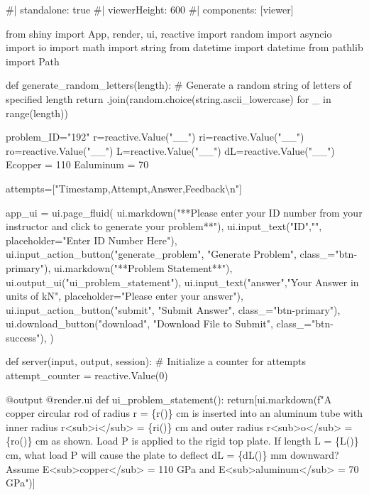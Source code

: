 \documentclass[
  letterpaper,
  DIV=11,
  numbers=noendperiod]{scrreprt}
\newenvironment{Shaded}{\begin{snugshade}}{\end{snugshade}}
\newcommand{\NormalTok}[1]{\textcolor[rgb]{0.00,0.23,0.31}{#1}}
\begin{document}
\begin{Shaded}
\begin{Highlighting}[]
\NormalTok{\#| standalone: true}
\NormalTok{\#| viewerHeight: 600}
\NormalTok{\#| components: [viewer]}

\NormalTok{from shiny import App, render, ui, reactive}
\NormalTok{import random}
\NormalTok{import asyncio}
\NormalTok{import io}
\NormalTok{import math}
\NormalTok{import string}
\NormalTok{from datetime import datetime}
\NormalTok{from pathlib import Path}

\NormalTok{def generate\_random\_letters(length):}
\NormalTok{    \# Generate a random string of letters of specified length}
\NormalTok{    return \textquotesingle{}\textquotesingle{}.join(random.choice(string.ascii\_lowercase) for \_ in range(length)) }

\NormalTok{problem\_ID="192"}
\NormalTok{r=reactive.Value("\_\_")}
\NormalTok{ri=reactive.Value("\_\_")}
\NormalTok{ro=reactive.Value("\_\_")}
\NormalTok{L=reactive.Value("\_\_")}
\NormalTok{dL=reactive.Value("\_\_")}
\NormalTok{Ecopper = 110}
\NormalTok{Ealuminum = 70}



\NormalTok{attempts=["Timestamp,Attempt,Answer,Feedback\textbackslash{}n"]}

\NormalTok{app\_ui = ui.page\_fluid(}
\NormalTok{    ui.markdown("**Please enter your ID number from your instructor and click to generate your problem**"),}
\NormalTok{    ui.input\_text("ID","", placeholder="Enter ID Number Here"),}
\NormalTok{    ui.input\_action\_button("generate\_problem", "Generate Problem", class\_="btn{-}primary"),}
\NormalTok{    ui.markdown("**Problem Statement**"),}
\NormalTok{    ui.output\_ui("ui\_problem\_statement"),}
\NormalTok{    ui.input\_text("answer","Your Answer in units of kN", placeholder="Please enter your answer"),}
\NormalTok{    ui.input\_action\_button("submit", "Submit Answer", class\_="btn{-}primary"),}
\NormalTok{    ui.download\_button("download", "Download File to Submit", class\_="btn{-}success"),}
\NormalTok{)}


\NormalTok{def server(input, output, session):}
\NormalTok{    \# Initialize a counter for attempts}
\NormalTok{    attempt\_counter = reactive.Value(0)}

\NormalTok{    @output}
\NormalTok{    @render.ui}
\NormalTok{    def ui\_problem\_statement():}
\NormalTok{        return[ui.markdown(f"A copper circular rod of radius r = \{r()\} cm is inserted into an aluminum tube with inner radius r\textless{}sub\textgreater{}i\textless{}/sub\textgreater{} = \{ri()\} cm and outer radius r\textless{}sub\textgreater{}o\textless{}/sub\textgreater{} = \{ro()\} cm as shown. Load P is applied to the rigid top plate. If length L = \{L()\} cm, what load P will cause the plate to deflect dL = \{dL()\} mm downward? Assume E\textless{}sub\textgreater{}copper\textless{}/sub\textgreater{} = 110 GPa and E\textless{}sub\textgreater{}aluminum\textless{}/sub\textgreater{} = 70 GPa")]}
    

\end{Highlighting}
\end{Shaded}
\end{document}
